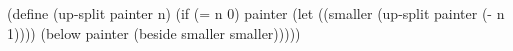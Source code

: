 \begtt\scm
(define (up-split painter n)
  (if (= n 0)
      painter
      (let ((smaller (up-split painter (- n 1))))
        (below painter (beside smaller smaller)))))
\endtt
